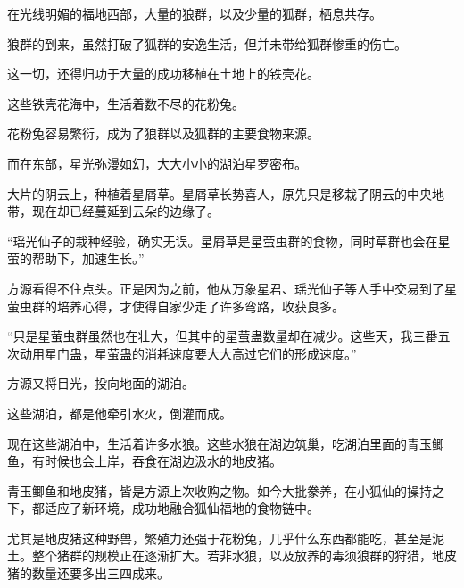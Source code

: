 \begin{this_body}
在光线明媚的福地西部，大量的狼群，以及少量的狐群，栖息共存。

狼群的到来，虽然打破了狐群的安逸生活，但并未带给狐群惨重的伤亡。

这一切，还得归功于大量的成功移植在土地上的铁壳花。

这些铁壳花海中，生活着数不尽的花粉兔。

花粉兔容易繁衍，成为了狼群以及狐群的主要食物来源。

而在东部，星光弥漫如幻，大大小小的湖泊星罗密布。

大片的阴云上，种植着星屑草。星屑草长势喜人，原先只是移栽了阴云的中央地带，现在却已经蔓延到云朵的边缘了。

“瑶光仙子的栽种经验，确实无误。星屑草是星萤虫群的食物，同时草群也会在星萤的帮助下，加速生长。”

方源看得不住点头。正是因为之前，他从万象星君、瑶光仙子等人手中交易到了星萤虫群的培养心得，才使得自家少走了许多弯路，收获良多。

“只是星萤虫群虽然也在壮大，但其中的星萤蛊数量却在减少。这些天，我三番五次动用星门蛊，星萤蛊的消耗速度要大大高过它们的形成速度。”

方源又将目光，投向地面的湖泊。

这些湖泊，都是他牵引水火，倒灌而成。

现在这些湖泊中，生活着许多水狼。这些水狼在湖边筑巢，吃湖泊里面的青玉鲫鱼，有时候也会上岸，吞食在湖边汲水的地皮猪。

青玉鲫鱼和地皮猪，皆是方源上次收购之物。如今大批豢养，在小狐仙的操持之下，都适应了新环境，成功地融合狐仙福地的食物链中。

尤其是地皮猪这种野兽，繁殖力还强于花粉兔，几乎什么东西都能吃，甚至是泥土。整个猪群的规模正在逐渐扩大。若非水狼，以及放养的毒须狼群的狩猎，地皮猪的数量还要多出三四成来。

\end{this_body}

